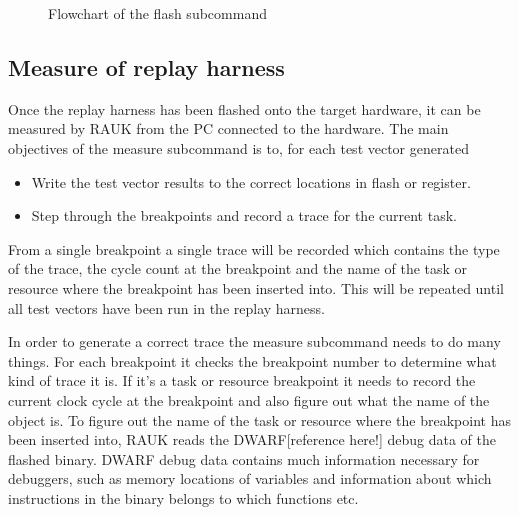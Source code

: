 \begin{figure}[H]
    \centering
    \caption{Flowchart of the flash subcommand}
    \label{fig:flashcmd}
\end{figure}

\subsection{Measure of replay harness}
Once the replay harness has been flashed onto the target hardware, it can
be measured by RAUK from the PC connected to the hardware. The main objectives
of the measure subcommand is to, for each test vector generated
\begin{itemize}
   \item Write the test vector results to the correct locations in flash or register.
   \item Step through the breakpoints and record a trace for the current task.
\end{itemize}
From a single breakpoint a single trace will be recorded which contains the
type of the trace, the cycle count at the breakpoint and the name of the task
or resource where the breakpoint has been inserted into.  This will be repeated
until all test vectors have been run in the replay harness.

In order to generate a correct trace the measure subcommand needs to do many
things. For each breakpoint it checks the breakpoint number to determine what
kind of trace it is. If it's a task or resource breakpoint it needs to record
the current clock cycle at the breakpoint and also figure out what the name
of the object is. To figure out the name of the task or resource where the
breakpoint has been inserted into, RAUK reads the DWARF[reference here!] debug
data of the flashed binary. DWARF debug data contains much information
necessary for debuggers, such as memory locations of variables and information
about which instructions in the binary belongs to which functions etc.

